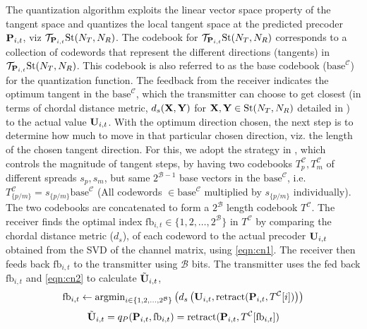 \documentclass[conference]{IEEEtran}
\begin{document}
The quantization algorithm exploits the linear vector space property of the tangent space and quantizes the local tangent space at the predicted precoder ${\bf P}_{i,t}$, viz $\mathcal{T}_{{\bf P}_{i,t}} \text{St}(N_T,N_R)$.
The codebook for $\mathcal{T}_{{\bf P}_{i,t}} \text{St}(N_T,N_R)$ corresponds to a collection of codewords that represent the different directions (tangents) in $\mathcal{T}_{{\bf P}_{i,t}} \text{St}(N_T,N_R)$.
This codebook is also referred to as the base codebook ($\text{base}^{\mathcal{C}}$) for the quantization function.
The feedback from the receiver indicates the optimum tangent in the $\text{base}^{\mathcal{C}}$, which the transmitter can choose to get closest (in terms of chordal distance metric, $d_s({\bf X},{\bf Y})$ for ${\bf X},{\bf Y} \in \text{St}(N_T,N_R)$ detailed in \cite{Gupt1905:Predictive,6891198}) to the actual value ${\bf U}_{i,t}$.
With the optimum direction chosen, the next step is to determine how much to move in that particular chosen direction, viz. the length of the chosen tangent direction.
For this, we adopt the strategy in \cite{6891198}, which
controls the magnitude of tangent steps, by having two codebooks
$T^{\mathcal{C}}_p,T^{\mathcal{C}}_m$ of different spreads $s_p,s_m$, but same $2^{\mathcal{B}-1}$ base vectors in the $\text{base}^{\mathcal{C}}$, i.e. $T^{\mathcal{C}}_{\{p/m\}}=s_{\{p/m\}}\text{base}^{\mathcal{C}}$ (All codewords $\in \text{base}^{\mathcal{C}}$ multiplied by $s_{\{p/m\}}$ individually).
The two codebooks are concatenated to form a $2^\mathcal{B}$ length codebook $T^\mathcal{C}$.
The receiver finds the optimal index $\text{fb}_{i,t} \in \{1,2,\ldots,2^{\mathcal{B}}\}$ in $T^\mathcal{C}$ by comparing the chordal distance metric ($d_s$), of each codeword to the actual precoder ${\bf U}_{i,t}$ obtained from the SVD of the channel matrix, using \eqref{eqn:cn1}. The receiver then feeds back $\text{fb}_{i,t}$ to the transmitter using $\mathcal{B}$ bits. The transmitter uses the fed back $\text{fb}_{i,t}$ and \eqref{eqn:cn2} to calculate $\tilde{{\bf U}}_{i,t}$,
\begin{equation}
\label{eqn:cn1}
\text{fb}_{i,t} \gets \text{argmin}_{i \in \{1,2,\ldots,2^{\mathcal{B}}\}}\left (d_s\left (\bU_{i,t},\text{retract}(\bP_{i,t},T^\mathcal{C}[i])\right ) \right)
\end{equation}
\begin{equation}
\tilde{\bU}_{i,t}=q_P(\bP_{i,t},\text{fb}_{i,t})=\text{retract}(\bP_{i,t},T^\mathcal{C}[\text{fb}_{i,t}])
\label{eqn:cn2}
\end{equation}
\end{document}
